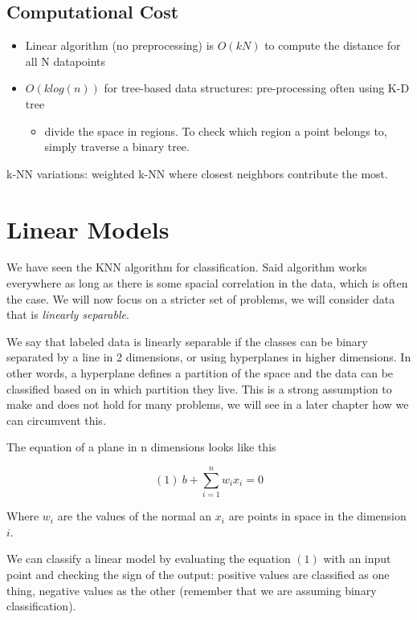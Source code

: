 \documentclass[11pt]{article}
\begin{document}
\subsection{Computational Cost}\label{computational-cost}

\begin{itemize}
\tightlist
\item
  Linear algorithm (no preprocessing) is \(O(kN)\) to compute the
  distance for all N datapoints
\item
  \(O(klog(n))\) for tree-based data structures: pre-processing often
  using K-D tree

  \begin{itemize}
  \tightlist
  \item
    divide the space in regions. To check which region a point belongs
    to, simply traverse a binary tree.
  \end{itemize}
\end{itemize}

k-NN variations: weighted k-NN where closest neighbors contribute the
most.

\section{Linear Models}\label{linear-models}

We have seen the KNN algorithm for classification. Said algorithm works
everywhere as long as there is some spacial correlation in the data,
which is often the case. We will now focus on a stricter set of
problems, we will consider data that is \emph{linearly separable}.

We say that labeled data is linearly separable if the classes can be
binary separated by a line in 2 dimensions, or using hyperplanes in
higher dimensions. In other words, a hyperplane defines a partition of
the space and the data can be classified based on in which partition
they live. This is a strong assumption to make and does not hold for
many problems, we will see in a later chapter how we can circumvent
this.

The equation of a plane in n dimensions looks like this

\[(1)\ b+\sum_{i=1}^{n}w_ix_i=0\]

Where \(w_i\) are the values of the normal an \(x_i\) are points in
space in the dimension \(i\).

We can classify a linear model by evaluating the equation \((1)\) with
an input point and checking the sign of the output: positive values are
classified as one thing, negative values as the other (remember that we
are assuming binary classification).
\end{document}
